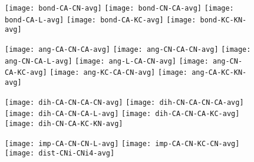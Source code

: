 \documentclass{article}
\begin{document}
\begin{figure}
  \begin{center}
    \begin{minipage}[t]{1.0\textwidth}
      \texttt{[image: bond-CA-CN-avg]}
      \texttt{[image: bond-CN-CA-avg]}
      \texttt{[image: bond-CA-L-avg]}
      \texttt{[image: bond-CA-KC-avg]}
      \texttt{[image: bond-KC-KN-avg]}
    \end{minipage}
  \end{center}
\end{figure}

\begin{figure}
  \begin{center}
    \begin{minipage}[t]{1.0\textwidth}
      \texttt{[image: ang-CA-CN-CA-avg]}
      \texttt{[image: ang-CN-CA-CN-avg]}
      \texttt{[image: ang-CN-CA-L-avg]}
      \texttt{[image: ang-L-CA-CN-avg]}
      \texttt{[image: ang-CN-CA-KC-avg]}
      \texttt{[image: ang-KC-CA-CN-avg]}
      \texttt{[image: ang-CA-KC-KN-avg]}
    \end{minipage}
  \end{center}
\end{figure}

\begin{figure}
  \begin{center}
    \begin{minipage}[t]{1.0\textwidth}
      \texttt{[image: dih-CA-CN-CA-CN-avg]}
      \texttt{[image: dih-CN-CA-CN-CA-avg]}
      \texttt{[image: dih-CA-CN-CA-L-avg]}
      \texttt{[image: dih-CA-CN-CA-KC-avg]}
      \texttt{[image: dih-CN-CA-KC-KN-avg]}
    \end{minipage}
  \end{center}
\end{figure}

\begin{figure}
  \begin{center}
    \begin{minipage}[t]{1.0\textwidth}
      \texttt{[image: imp-CA-CN-CN-L-avg]}
      \texttt{[image: imp-CA-CN-KC-CN-avg]}
      \texttt{[image: dist-CNi-CNi4-avg]}
    \end{minipage}
  \end{center}
\end{figure}
\end{document}
